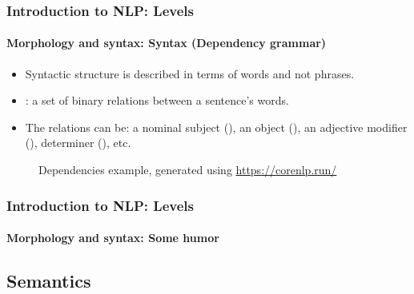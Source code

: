 \documentclass[xcolor=table]{beamer}
\begin{document}
\begin{frame}
\frametitle{Introduction to NLP: Levels}
\framesubtitle{Morphology and syntax: Syntax (Dependency grammar)}

\begin{itemize}
	\item Syntactic structure is described in terms of words and not phrases.
	\item {}: a set of binary relations between a sentence's words.
	\item The relations can be: a nominal subject (), an object (), an adjective modifier (), determiner (), etc.
\end{itemize}

\begin{figure}
	\centering
	\caption{Dependencies example, generated using \url{https://corenlp.run/}}
\end{figure}

\end{frame}

\begin{frame}
\frametitle{Introduction to NLP: Levels}
\framesubtitle{Morphology and syntax: Some humor}

\begin{center}
\end{center}

\end{frame}

\subsection{Semantics}
\end{document}
